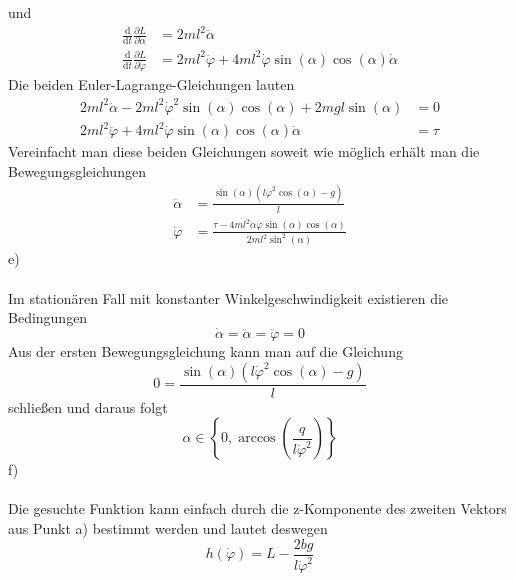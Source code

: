 und
\begin{align*}
	\frac{\text{d}}{\text{d}t}\frac{\partial L}{\partial \dot{\alpha}}  &= 2ml^2\ddot{\alpha} \\
	\frac{\text{d}}{\text{d}t}\frac{\partial L}{\partial \dot{\varphi}} &= 2ml^2\ddot{\varphi} + 4ml^2\dot{\varphi}\sin(\alpha)\cos(\alpha)\dot{\alpha}
\end{align*}
Die beiden Euler-Lagrange-Gleichungen lauten
\begin{align*}
	2ml^2\ddot{\alpha} - 2ml^2\dot{\varphi}^2\sin(\alpha)\cos(\alpha) + 2mgl\sin(\alpha) &= 0 \\
	2ml^2\ddot{\varphi} + 4ml^2\dot{\varphi}\sin(\alpha)\cos(\alpha)\dot{\alpha} &= \tau
\end{align*}
Vereinfacht man diese beiden Gleichungen soweit wie möglich erhält man die Bewegungsgleichungen
\begin{align*}
	\ddot{\alpha} &= \frac{\sin(\alpha)(l\dot{\varphi}^2\cos(\alpha) - g)}{l} \\
	\ddot{\varphi} &= \frac{\tau - 4ml^2\dot{\alpha}\dot{\varphi}\sin(\alpha)\cos(\alpha)}{2ml^2\sin^2(\alpha)}
\end{align*}
\newpage
\noindent
e)\\ \\
Im stationären Fall mit konstanter Winkelgeschwindigkeit existieren die Bedingungen
\[
	\dot{\alpha} = \ddot{\alpha} = \ddot{\varphi} = 0
\]
Aus der ersten Bewegungsgleichung kann man auf die Gleichung
\[
	0 = \frac{\sin(\alpha)(l\dot{\varphi}^2\cos(\alpha) - g)}{l}
\]
schließen und daraus folgt
\[
	   \alpha \in \left\{0, \arccos\left(\frac{q}{l\dot{\varphi}^2}\right)
	  \right\}
\]
f)\\ \\
Die gesuchte Funktion kann einfach durch die z-Komponente des zweiten Vektors aus Punkt a) bestimmt werden und lautet deswegen
\[
	h(\dot{\varphi}) = L - \frac{2bg}{l\dot{\varphi}^2}
\]